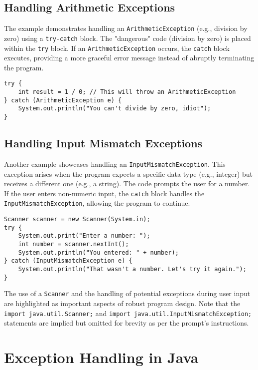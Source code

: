 \documentclass{article}
\begin{document}
\subsection{Handling Arithmetic Exceptions}

The example demonstrates handling an \texttt{ArithmeticException} (e.g., division by zero) using a \texttt{try-catch} block. The "dangerous" code (division by zero) is placed within the \texttt{try} block. If an \texttt{ArithmeticException} occurs, the \texttt{catch} block executes, providing a more graceful error message instead of abruptly terminating the program.

\begin{verbatim}
try {
    int result = 1 / 0; // This will throw an ArithmeticException
} catch (ArithmeticException e) {
    System.out.println("You can't divide by zero, idiot");
}
\end{verbatim}


\subsection{Handling Input Mismatch Exceptions}

Another example showcases handling an \texttt{InputMismatchException}. This exception arises when the program expects a specific data type (e.g., integer) but receives a different one (e.g., a string).  The code prompts the user for a number. If the user enters non-numeric input, the \texttt{catch} block handles the \texttt{InputMismatchException}, allowing the program to continue.

\begin{verbatim}
Scanner scanner = new Scanner(System.in);
try {
    System.out.print("Enter a number: ");
    int number = scanner.nextInt();
    System.out.println("You entered: " + number);
} catch (InputMismatchException e) {
    System.out.println("That wasn't a number. Let's try it again.");
}
\end{verbatim}

The use of a \texttt{Scanner} and the handling of potential exceptions during user input are highlighted as important aspects of robust program design.  Note that the \texttt{import java.util.Scanner;} and \texttt{import java.util.InputMismatchException;} statements are implied but omitted for brevity as per the prompt's instructions.


\section{Exception Handling in Java}
\end{document}
